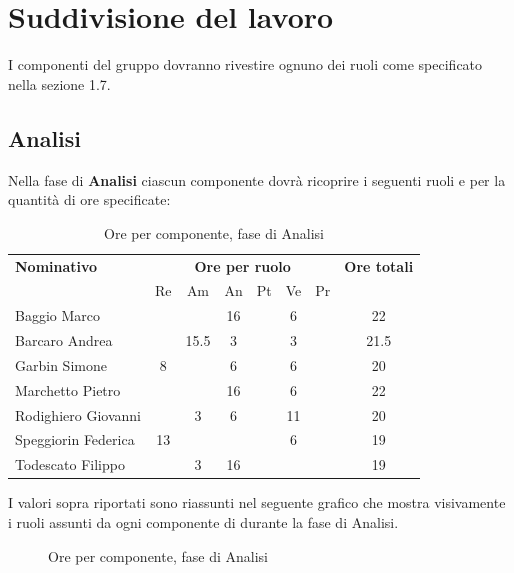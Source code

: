 \section{Suddivisione del lavoro}
I componenti del gruppo dovranno rivestire ognuno dei ruoli come specificato nella sezione
1.7.
\subsection{Analisi}
Nella fase di \textbf{Analisi} ciascun componente dovrà ricoprire i seguenti ruoli e per la quantità di ore specificate:

\begin{table}[H]
\centering
\begin{tabular}{|l|c|c|c|c|c|c|c|}
\hline
\textbf{Nominativo} & 
\multicolumn{6}{c|}{\textbf{Ore per ruolo}} & 
\textbf{Ore totali} \\
& Re & Am & An  & Pt & Ve & Pr & \\
\hline
Baggio Marco
  & 
  & 
  & 16
  & 
  & 6
  & 
  &
  22
  \\
Barcaro Andrea
  & 
  & 15.5
  & 3
  & 
  & 3
  & 
  &
 21.5
  \\
Garbin Simone
  & 8
  & 
  & 6
  & 
  & 6
  & 
  &
  20
  \\
Marchetto Pietro
  & 
  & 
  & 16
  & 
  & 6
  & 
  &
  22
  \\
Rodighiero Giovanni
  & 
  & 3
  & 6
  & 
  & 11
  & 
  &
  20
  \\
Speggiorin Federica
  & 13
  & 
  & 
  & 
  & 6
  & 
  &
  19
  \\
Todescato Filippo
  & 
  & 3
  & 16
  & 
  & 
  & 
  &
  19
  \\
\hline
\end{tabular}
\caption{Ore per componente, fase di Analisi}
\end{table}
I valori sopra riportati sono riassunti nel seguente grafico che mostra visivamente i ruoli assunti da ogni componente di \GroupName{} durante la fase di Analisi.
\begin{figure}[H]
\centering
{}
\caption{Ore per componente, fase di Analisi}
\end{figure}



